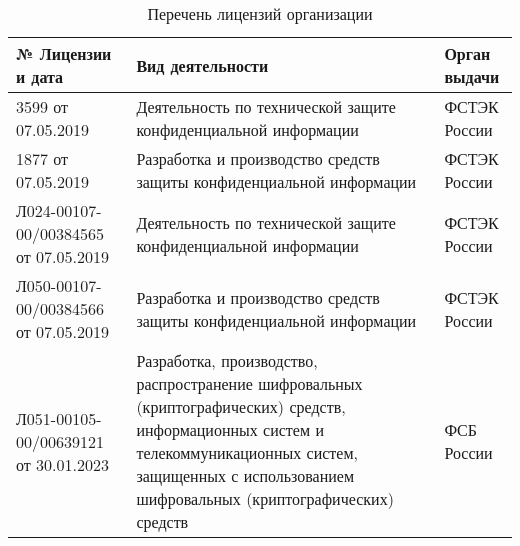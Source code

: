 \setcounter{table}{0}
\begin{table}
\small %
\centering
\caption{Перечень лицензий организации}
\begin{tabularx}{\textwidth}{|l|X|>{\raggedright\arraybackslash}p{3cm}|}
\hline
\textbf{№ Лицензии и дата} & \textbf{Вид деятельности} & \textbf{Орган выдачи} \\
\hline
3599 от 07.05.2019 & Деятельность по технической защите конфиденциальной информации & ФСТЭК России \\
\hline
1877 от 07.05.2019 & Разработка и производство средств защиты конфиденциальной информации & ФСТЭК России \\
\hline
Л024-00107-00/00384565 от 07.05.2019 & Деятельность по технической защите конфиденциальной информации & ФСТЭК России \\
\hline
Л050-00107-00/00384566 от 07.05.2019 & Разработка и производство средств защиты конфиденциальной информации & ФСТЭК России \\
\hline
Л051-00105-00/00639121 от 30.01.2023 &
Разработка, производство, распространение шифровальных (криптографических) средств, информационных систем и телекоммуникационных систем, защищенных с использованием шифровальных (криптографических) средств &
ФСБ России \\
\hline
\end{tabularx}
\label{tab:licenses}
\end{table}
